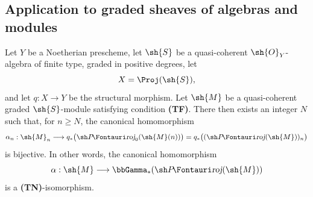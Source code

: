 \subsection{Application to graded sheaves of algebras and modules}
\label{subsection:III.2.3}

\begin{theorem}[2.3.1]
\label{III.2.3.1}
Let $Y$ be a Noetherian prescheme, let $\sh{S}$ be a quasi-coherent $\sh{O}_Y$-algebra of finite type, graded in positive degrees, let
\[
  X=\Proj(\sh{S}),
\]
and let $q:X\to Y$ be the structural morphism.
Let $\sh{M}$ be a quasi-coherent graded $\sh{S}$-module satisfying condition \textbf{(TF)}.
There then exists an integer $N$ such that, for $n\geq N$, the canonical homomorphism 
\[
  \alpha_n:\sh{M}_n
  \longrightarrow q_*\bigl(\shProj_0(\sh{M}(n))\bigr)
  =q_*\bigl((\shProj(\sh{M}))_n\bigr)
\]
is bijective.
In other words, the canonical homomorphism
\[
  \alpha:\sh{M}\longrightarrow\bbGamma_*(\shProj(\sh{M}))
\]
is a \textbf{(TN)}-isomorphism.
\end{theorem}

